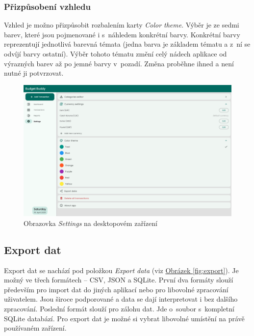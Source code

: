 \documentclass[
  biblatex,
  figures=true,
  tables=false,
  glossaries,
  index
]{kidiplom}
\begin{document}
\subsubsection{Přizpůsobení vzhledu}
Vzhled je možno přizpůsobit rozbalením karty \textit{Color theme}. Výběr je ze sedmi barev, které jsou pojmenované i s~náhledem konkrétní barvy. Konkrétní barvy reprezentují jednotlivá barevná témata (jedna barva je základem tématu a z~ní se odvíjí barvy ostatní). Výběr tohoto tématu změní celý nádech aplikace od výrazných barev až po jemné barvy v~pozadí. Změna proběhne ihned a není nutné ji potvrzovat.

\begin{figure}
  \centering
  \includegraphics[width=\textwidth]{images/settings-large.png}
  \caption{Obrazovka \textit{Settings} na desktopovém zařízení}
  \label{fig:settings}
\end{figure}

\subsection{Export dat}
Export dat se nachází pod položkou \textit{Export data} (viz \hyperref[fig:export]{Obrázek \ref{fig:export}}). Je možný ve třech formátech -- CSV, JSON a SQLite. První dva formáty slouží především pro import dat do jiných aplikací nebo pro libovolné zpracování uživatelem. Jsou široce podporované a data se dají interpretovat i bez dalšího zpracování. Poslední formát slouží pro zálohu dat. Jde o~soubor s~kompletní SQLite databází. Pro export dat je možné si vybrat libovolné umístění na právě používaném zařízení.
\end{document}
